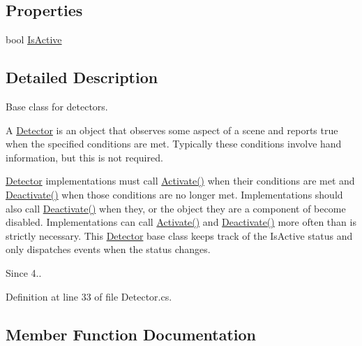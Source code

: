 \subsection*{Properties}
\begin{DoxyCompactItemize}
\item 
bool \mbox{\hyperlink{class_leap_1_1_unity_1_1_detector_a89e15d17ea95587d9edf49c42473264d}{Is\+Active}}
\end{DoxyCompactItemize}


\subsection{Detailed Description}
Base class for detectors.

A \mbox{\hyperlink{class_leap_1_1_unity_1_1_detector}{Detector}} is an object that observes some aspect of a scene and reports true when the specified conditions are met. Typically these conditions involve hand information, but this is not required.

\mbox{\hyperlink{class_leap_1_1_unity_1_1_detector}{Detector}} implementations must call \mbox{\hyperlink{class_leap_1_1_unity_1_1_detector_aed8730358778949381639d53df61aac8}{Activate()}} when their conditions are met and \mbox{\hyperlink{class_leap_1_1_unity_1_1_detector_a6493874fd22793d7b59dc56098559d59}{Deactivate()}} when those conditions are no longer met. Implementations should also call \mbox{\hyperlink{class_leap_1_1_unity_1_1_detector_a6493874fd22793d7b59dc56098559d59}{Deactivate()}} when they, or the object they are a component of become disabled. Implementations can call \mbox{\hyperlink{class_leap_1_1_unity_1_1_detector_aed8730358778949381639d53df61aac8}{Activate()}} and \mbox{\hyperlink{class_leap_1_1_unity_1_1_detector_a6493874fd22793d7b59dc56098559d59}{Deactivate()}} more often than is strictly necessary. This \mbox{\hyperlink{class_leap_1_1_unity_1_1_detector}{Detector}} base class keeps track of the Is\+Active status and only dispatches events when the status changes.

\begin{DoxySince}{Since}
4.. 
\end{DoxySince}


Definition at line 33 of file Detector.\+cs.



\subsection{Member Function Documentation}
\mbox{\label{class_leap_1_1_unity_1_1_detector_aed8730358778949381639d53df61aac8}} 
